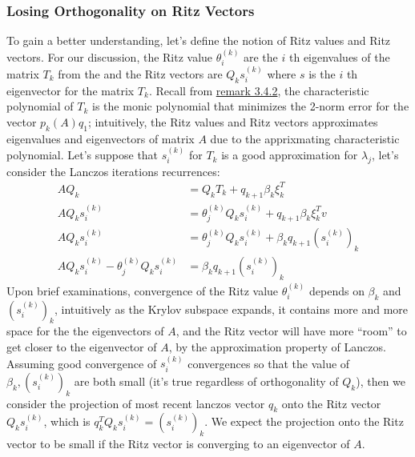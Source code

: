 \documentclass[]{article}
\theoremstyle{definition}
\begin{document}
        \subsubsection{Losing Orthogonality on Ritz Vectors}
            To gain a better understanding, let's define the notion of Ritz values and Ritz vectors. For our discussion, the Ritz value $\theta_i^{(k)}$ are the $i$ th eigenvalues of the matrix $T_k$ from the and the Ritz vectors are $Q_ks_{i}^{(k)}$ where $s$ is the $i$ th eigenvector for the matrix $T_k$. Recall from \hyperref[remark:Minimal_Polynomial_from_Lanczos_Iterations]{remark 3.4.2}, the characteristic polynomial of $T_k$ is the monic polynomial that minimizes the 2-norm error for the vector $p_k(A)q_1$; intuitively, the Ritz values and Ritz vectors approximates eigenvalues and eigenvectors of matrix $A$ due to the apprixmating characteristic polynomial. Let's suppose that $s_i^{(k)}$ for $T_k$ is a good approximation for $\lambda_j$, let's consider the Lanczos iterations recurrences: 
            \begin{align}
                AQ_k &= Q_k T_k + q_{k + 1}\beta_k\xi_k^T
                \\
                AQ_ks_i^{(k)} &= \theta_j^{(k)} Q_k s_i^{(k)} + q_{k + 1}\beta_k \xi_k^Tv
                \\
                AQ_ks_i^{(k)} &= \theta_j^{(k)} Q_k s_i^{(k)} + \beta_kq_{k + 1}(s_i^{(k)})_k
                \\
                AQ_ks_i^{(k)} - \theta_j^{(k)} Q_k s_i^{(k)} &=   \beta_kq_{k + 1}(s_i^{(k)})_k
            \end{align}
            Upon brief examinations, convergence of the Ritz value $\theta_{i}^{(k)}$ depends on $\beta_k$ and $(s_i^{(k)})_k$, intuitively as the Krylov subspace expands, it contains more and more space for the the eigenvectors of $A$, and the Ritz vector will have more ``room'' to get closer to the eigenvector of $A$, by the approximation property of Lanczos. Assuming good convergence of $s_i^{(k)}$ convergences so that the value of $\beta_k, (s_i^{(k)})_k$ are both small (it's true regardless of orthogonality of $Q_k$), then we consider the projection of most recent lanczos vector $q_k$ onto the Ritz vector $Q_ks_i^{(k)}$, which is $q_k^TQ_ks_i^{(k)} = (s_i^{(k)})_k$. We expect the projection onto the Ritz vector to be small if the Ritz vector is converging to an eigenvector of $A$.  
            \par
\end{document}
